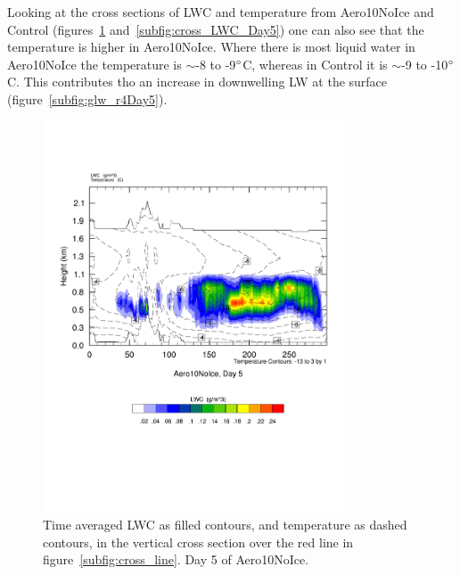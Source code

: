 Looking at the cross sections of LWC and temperature from Aero10NoIce and Control (figures~\ref{fig:cross_LWC_r4Day5} and~\ref{subfig:cross_LWC_Day5}) one can also see that the temperature is higher in Aero10NoIce. Where there is most liquid water in Aero10NoIce the temperature is $\sim$-8 to -9$\degree$C, whereas in Control it is $\sim$-9 to -10$\degree$C. This contributes tho an increase in downwelling LW at the surface (figure~\ref{subfig:glw_r4Day5}).

\begin{figure}
	\centering
	\includegraphics[width=0.8\textwidth]{results/aero10ni/Sec_LWC_Aero10NoIce_Day5.pdf}
	\caption{Time averaged LWC as filled contours, and temperature as dashed contours, in the vertical cross section over the red line in figure~\ref{subfig:cross_line}. Day 5 of Aero10NoIce.}
	\label{fig:cross_LWC_r4Day5}
\end{figure}